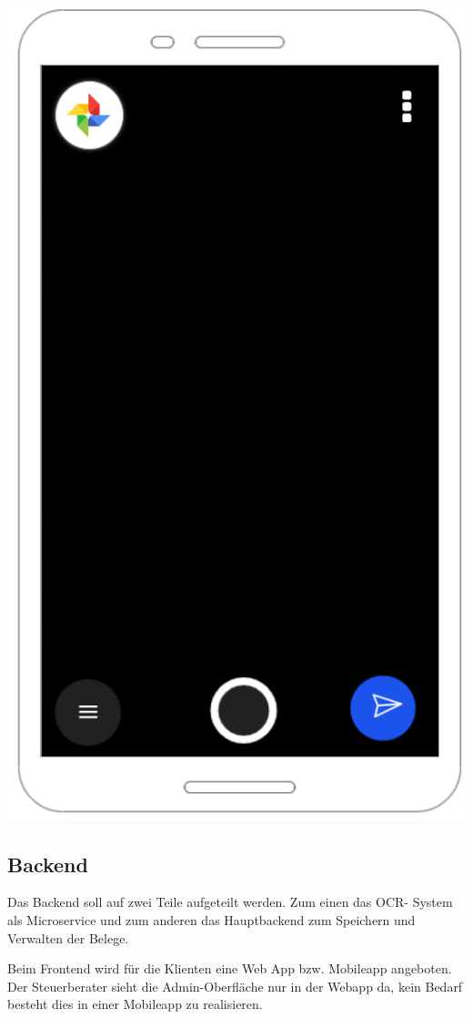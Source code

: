 \documentclass[12pt]{article}
\theoremstyle{definition}
\newcommand*{\skippingparagraph}{\par\vspace{\baselineskip}\noindent}
\begin{document}
\includegraphics[scale=0.5]{MobileSnapshotReceiptConcept}

\pagebreak
\subsection{Backend}
Das Backend soll auf zwei Teile aufgeteilt werden. Zum einen das OCR- System als Microservice und zum anderen das Hauptbackend zum Speichern und Verwalten der Belege.
\skippingparagraph
Beim Frontend wird für die Klienten eine Web App bzw. Mobileapp angeboten. Der Steuerberater sieht die Admin-Oberfläche nur in der Webapp da, kein Bedarf besteht dies in einer Mobileapp zu realisieren.
\end{document}
